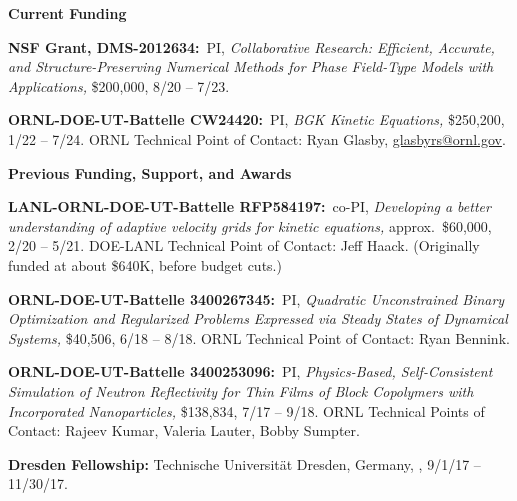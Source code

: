 \documentclass[11pt]{letter}
\begin{document}
	
{\LARGE\bf Current Funding}
    \begin{description}
    
    \item
\textbf{NSF Grant, DMS-2012634:}~PI, {\sl Collaborative Research:  Efficient, Accurate, and Structure-Preserving Numerical Methods for Phase Field-Type Models with Applications,} \$200,000, 8/20 -- 7/23.

    \item
\textbf{ORNL-DOE-UT-Battelle CW24420:}~PI, {\sl BGK Kinetic Equations,} \$250,200, 1/22 -- 7/24. ORNL Technical Point of Contact: Ryan Glasby, \url{glasbyrs@ornl.gov}.
    
    \end{description}
    
 
{\LARGE\bf Previous Funding, Support, and Awards}
    \begin{description} 
    
    \item
\textbf{LANL-ORNL-DOE-UT-Battelle RFP584197:}~co-PI, {\sl Developing a better understanding of adaptive velocity grids for kinetic equations,} approx.~\$60,000, 2/20 -- 5/21. DOE-LANL Technical Point of Contact: Jeff Haack. (Originally funded at about \$640K, before budget cuts.)
 
    \item
\textbf{ORNL-DOE-UT-Battelle 3400267345:}~PI, {\sl Quadratic Unconstrained Binary Optimization and Regularized Problems Expressed via Steady States of Dynamical Systems,} \$40,506, 6/18 -- 8/18. ORNL Technical Point of Contact: Ryan Bennink.
    
    
    
    \item
\textbf{ORNL-DOE-UT-Battelle 3400253096:}~PI, {\sl Physics-Based, Self-Consistent Simulation of Neutron Reflectivity for Thin Films of Block Copolymers with Incorporated Nanoparticles,} \$138,834, 7/17 -- 9/18. ORNL Technical Points of Contact: Rajeev Kumar, Valeria Lauter, Bobby Sumpter.

    \item
\textbf{Dresden Fellowship:} Technische Universit\"{a}t Dresden, Germany,  , 9/1/17 -- 11/30/17.
    

\end{description}
\end{document}
